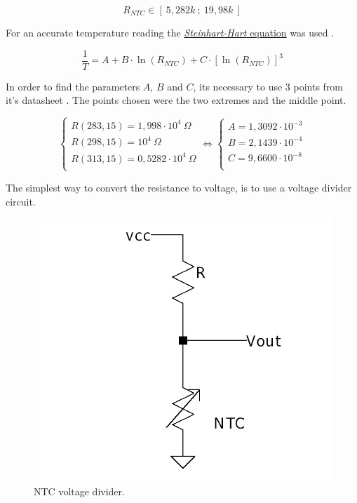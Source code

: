 \documentclass[12pt]{article}
\begin{document}
    $$R_{NTC} \in [~5,282k~;~19,98k~]$$

    For an accurate temperature reading the 
    \hyperref[eq:1]{ \textit{Steinhart-Hart} equation} was used .

    \begin{equation} \label{eq:1}
    \frac{1}{T} = A + B\cdot \ln(R_{NTC}) + C\cdot [\ln(R_{NTC})]^3
    \end{equation}

    In order to find the parameters $A$, $B$ and $C$, its necessary to use 3 points from it's datasheet \cite{NTC_datasheet}. 
    The points chosen were the two extremes and the middle point.
    
    \begin{equation}
        \begin{cases}
        
            R( 283,15 ) = 1,998\cdot 10^4 ~\Omega \\
            R( 298,15 ) = 10^4 ~\Omega\\
            R( 313,15 ) = 0,5282 \cdot 10^4 ~\Omega\\
        
        \end{cases}
        \Leftrightarrow
        \begin{cases}
            A = 1,3092 \cdot 10^{-3}\\
            B = 2,1439 \cdot 10^{-4}\\
            C = 9,6600 \cdot 10^{-8}\\
        
        \end{cases}
    \end{equation}

    The simplest way to convert the resistance to voltage, is to use a voltage divider circuit.

   \begin{figure}[H] 
        \centering
        \includegraphics*[scale = 0.25]{images/voltagedivider.png}
        \caption{NTC voltage divider.}
        \label{wrap-fig:1}
    \end{figure}
\end{document}
